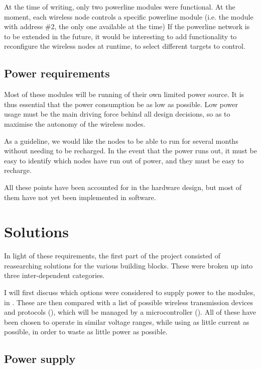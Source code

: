 At the time of writing, only two powerline modules were functional. At the
moment, each wireless node controls a specific powerline module (i.e. the module
with address \#2, the only one available at the time) If the powerline network is
to be extended in the future, it would be interesting to add functionality to
reconfigure the wireless nodes at runtime, to select different targets to
control.

\subsection{Power requirements}
Most of these modules will be running of their own limited power source. It is
thus essential that the power consumption be as low as possible. Low power usage
must be the main driving force behind all design decisions, so as to maximise
the autonomy of the wireless nodes. 

As a guideline, we would like the nodes to be able to run for several months
without needing to be recharged. In the event that the power runs out, it must
be easy to identify which nodes have run out of power, and they must be easy to
recharge. 

All these points have been accounted for in the hardware design, but most of
them have not yet been implemented in software. 

\section{Solutions}
In light of these requirements, the first part of the project consisted of
reasearching solutions for the various building blocks. These were broken up
into three inter-dependent categories. 

I will first discuss which options were considered to supply power to the
modules, in . These are then compared with a list of
possible wireless transmission devices and protocols (), which
will be managed by a microcontroller (). All of these
have been chosen to operate in similar voltage ranges, while using as little
current as possible, in order to waste as little power as possible.

\subsection{Power supply}
\label{sub:power-supply}

